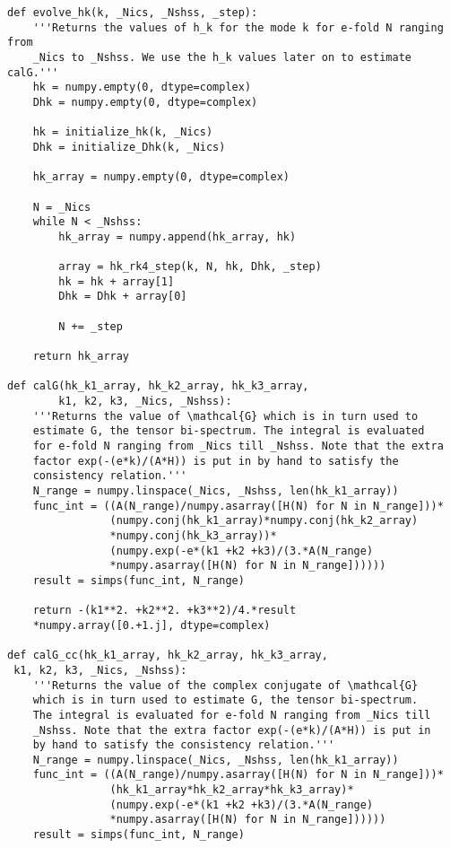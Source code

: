 \documentclass[12pt,a4paper,oneside]{book}
\begin{document}
\begin{appendices}
\begin{small}
\begin{verbatim}
def evolve_hk(k, _Nics, _Nshss, _step):
    '''Returns the values of h_k for the mode k for e-fold N ranging from
    _Nics to _Nshss. We use the h_k values later on to estimate calG.'''
    hk = numpy.empty(0, dtype=complex)
    Dhk = numpy.empty(0, dtype=complex)
    
    hk = initialize_hk(k, _Nics)
    Dhk = initialize_Dhk(k, _Nics)
    
    hk_array = numpy.empty(0, dtype=complex)
    
    N = _Nics
    while N < _Nshss:
        hk_array = numpy.append(hk_array, hk)

        array = hk_rk4_step(k, N, hk, Dhk, _step)
        hk = hk + array[1]
        Dhk = Dhk + array[0]

        N += _step

    return hk_array

def calG(hk_k1_array, hk_k2_array, hk_k3_array, 
		k1, k2, k3, _Nics, _Nshss):
    '''Returns the value of \mathcal{G} which is in turn used to 
    estimate G, the tensor bi-spectrum. The integral is evaluated 
    for e-fold N ranging from _Nics till _Nshss. Note that the extra 
    factor exp(-(e*k)/(A*H)) is put in by hand to satisfy the 
    consistency relation.'''
    N_range = numpy.linspace(_Nics, _Nshss, len(hk_k1_array))
    func_int = ((A(N_range)/numpy.asarray([H(N) for N in N_range]))*
                (numpy.conj(hk_k1_array)*numpy.conj(hk_k2_array)
                *numpy.conj(hk_k3_array))*
                (numpy.exp(-e*(k1 +k2 +k3)/(3.*A(N_range)
                *numpy.asarray([H(N) for N in N_range])))))
    result = simps(func_int, N_range)

    return -(k1**2. +k2**2. +k3**2)/4.*result
    *numpy.array([0.+1.j], dtype=complex)

def calG_cc(hk_k1_array, hk_k2_array, hk_k3_array,
 k1, k2, k3, _Nics, _Nshss):
    '''Returns the value of the complex conjugate of \mathcal{G} 
    which is in turn used to estimate G, the tensor bi-spectrum. 
    The integral is evaluated for e-fold N ranging from _Nics till 
    _Nshss. Note that the extra factor exp(-(e*k)/(A*H)) is put in 
    by hand to satisfy the consistency relation.'''
    N_range = numpy.linspace(_Nics, _Nshss, len(hk_k1_array))
    func_int = ((A(N_range)/numpy.asarray([H(N) for N in N_range]))*
                (hk_k1_array*hk_k2_array*hk_k3_array)*
                (numpy.exp(-e*(k1 +k2 +k3)/(3.*A(N_range)
                *numpy.asarray([H(N) for N in N_range])))))
    result = simps(func_int, N_range)


\end{verbatim}
\end{small}
\end{appendices}
\end{document}
